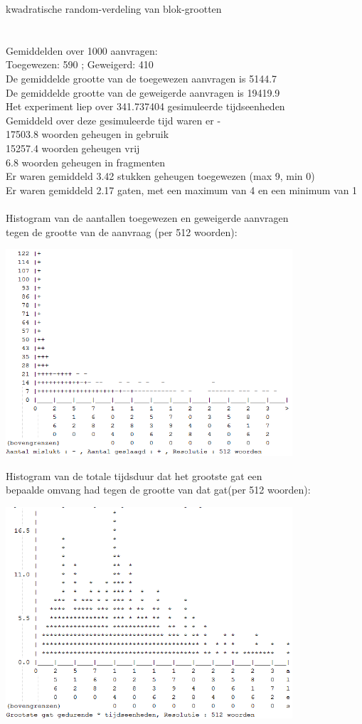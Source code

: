 \documentclass[a4paper]{article}
\begin{document}
kwadratische random-verdeling van blok-grootten\\
\\
\\
Gemiddelden over 1000 aanvragen:\\
Toegewezen: 590 ; Geweigerd: 410\\
De gemiddelde grootte van de toegewezen aanvragen is 5144.7\\
De gemiddelde grootte van de geweigerde aanvragen is 19419.9\\
Het experiment liep over 341.737404 gesimuleerde tijdseenheden\\
Gemiddeld over deze gesimuleerde tijd waren er - \\
 17503.8 woorden geheugen in gebruik\\
 15257.4 woorden geheugen vrij\\
     6.8 woorden geheugen in fragmenten\\
Er waren gemiddeld     3.42 stukken geheugen toegewezen (max 9, min 0)\\
Er waren gemiddeld     2.17 gaten, met een maximum van 4 en een minimum van 1\\
\\
Histogram van de aantallen toegewezen en geweigerde aanvragen\\
tegen de grootte van de aanvraag (per 512 woorden):
\begin{center}
\includegraphics[width=0.8\textwidth]{wf5.png}
\end{center}
Histogram van de totale tijdsduur dat het grootste gat een\\
bepaalde omvang had tegen de grootte van dat gat(per 512 woorden):
\begin{center}
\includegraphics[width=0.8\textwidth]{ff6.png}
\end{center}
\end{document}
